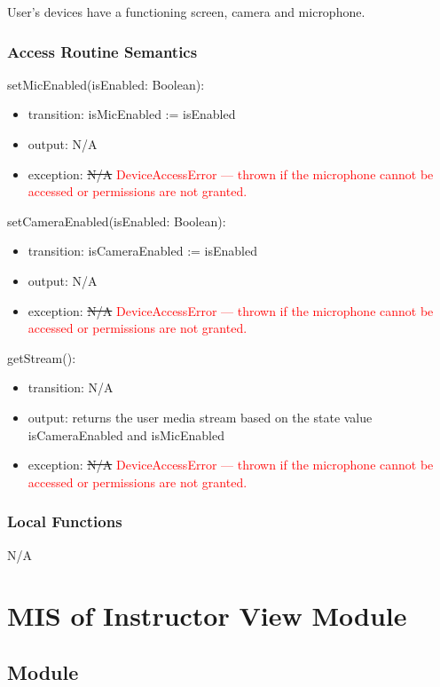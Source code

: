 \documentclass[12pt, titlepage]{article}
\newcommand{\rt}[1]{\textcolor{red}{#1}}
\begin{document}
User's devices have a functioning screen, camera and microphone.

\subsubsection{Access Routine Semantics}

\noindent setMicEnabled(isEnabled: Boolean):
\begin{itemize}
\item transition: isMicEnabled := isEnabled
\item output: N/A
\item exception: \sout{N/A} \rt{DeviceAccessError --- thrown if the microphone cannot be accessed or permissions are not granted.}
\end{itemize}

\noindent setCameraEnabled(isEnabled: Boolean):
\begin{itemize}
\item transition: isCameraEnabled := isEnabled
\item output: N/A
\item exception: \sout{N/A} \rt{DeviceAccessError --- thrown if the microphone cannot be accessed or permissions are not granted.}
\end{itemize}

\noindent getStream():
\begin{itemize}
\item transition: N/A
\item output: returns the user media stream based on the state value
  isCameraEnabled and isMicEnabled
\item exception: \sout{N/A} \rt{DeviceAccessError --- thrown if the microphone cannot be accessed or permissions are not granted.}
\end{itemize}

\subsubsection{Local Functions}

N/A


\section{MIS of Instructor View Module} \label{sec:instrcview}

\subsection{Module}
\end{document}
